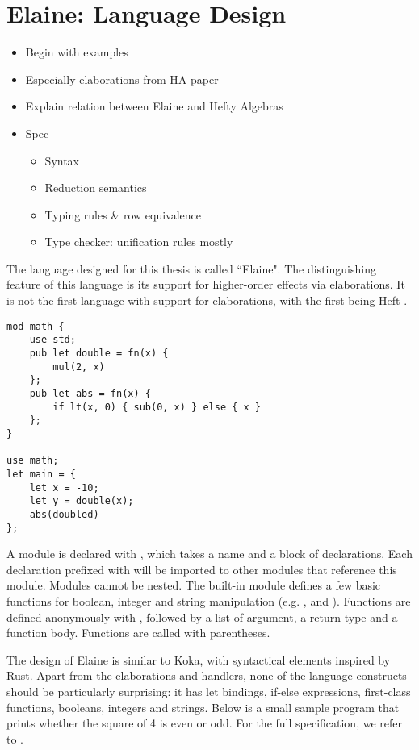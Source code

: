 \chapter{Elaine: Language Design}

\begin{itemize}
\item Begin with examples
\item Especially elaborations from HA paper
\item Explain relation between Elaine and Hefty Algebras
\item Spec
    \begin{itemize}
    \item Syntax
    \item Reduction semantics
    \item Typing rules \& row equivalence
    \item Type checker: unification rules mostly
    \end{itemize}
\end{itemize}

The language designed for this thesis is called ``Elaine". The distinguishing feature of this language is its support for higher-order effects via elaborations. It is not the first language with support for elaborations, with the first being Heft \citationneeded.

\begin{lstlisting}[style=fancy]
mod math {
    use std;
    pub let double = fn(x) {
        mul(2, x)
    };
    pub let abs = fn(x) {
        if lt(x, 0) { sub(0, x) } else { x }
    };
}

use math;
let main = {
    let x = -10;
    let y = double(x);
    abs(doubled)
};
\end{lstlisting}

A module is declared with , which takes a name and a block of declarations. Each declaration prefixed with  will be imported to other modules that reference this module. Modules cannot be nested. The built-in  module defines a few basic functions for boolean, integer and string manipulation (e.g. ,  and ). Functions are defined anonymously with , followed by a list of argument, a return type and a function body. Functions are called with parentheses.

The design of Elaine is similar to Koka, with syntactical elements inspired by Rust. Apart from the elaborations and handlers, none of the language constructs should be particularly surprising: it has let bindings, if-else expressions, first-class functions, booleans, integers and strings. Below is a small sample program that prints whether the square of 4 is even or odd. For the full specification, we refer to .

